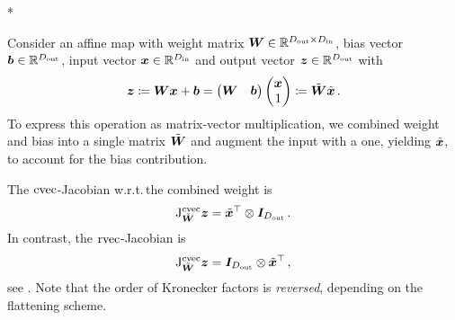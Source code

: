 \switchcolumn[1]*
\switchcolumn[0]

\begin{example}
  Consider an affine map with weight matrix ${\bm{W}} \in {\mathbb{R}}^{D_{\text{out}} \times D_{\text{in}}}$, bias vector ${\bm{b}} \in {\mathbb{R}}^{D_{\text{out}}}$, input vector ${\bm{x}} \in {\mathbb{R}}^{D_{\text{in}}}$ and output vector ${\bm{z}} \in {\mathbb{R}}^{D_{\text{out}}}$ with
  \begin{align*}
    {\bm{z}}
    \coloneqq
    {\bm{W}} {\bm{x}} + {\bm{b}}
    =
    \begin{pmatrix}
      {\bm{W}} & {\bm{b}}
    \end{pmatrix}
    \begin{pmatrix}
      {\bm{x}} \\ 1
    \end{pmatrix}
    \coloneqq
    \tilde{{\bm{W}}}
    \tilde{{\bm{x}}}\,.
  \end{align*}
  To express this operation as matrix-vector multiplication, we combined weight and bias into a single matrix $\tilde{{\bm{W}}}$ and augment the input with a one, yielding $\tilde{{\bm{x}}}$, to account for the bias contribution.

  The $\operatorname{cvec}$-Jacobian w.r.t.\,the combined weight is
  \begin{align*}
    \mathrm{J}^{\operatorname{cvec}}_{\tilde{{\bm{W}}}}{\bm{z}}
    =
    \tilde{{\bm{x}}}^{\top}
    \otimes
    {\bm{I}}_{D_{\text{out}}}\,.
  \end{align*}
  In contrast, the $\operatorname{rvec}$-Jacobian is
  \begin{align*}
    \mathrm{J}^{\operatorname{cvec}}_{\tilde{{\bm{W}}}}{\bm{z}}
    =
    {\bm{I}}_{D_{\text{out}}}
    \otimes
    \tilde{{\bm{x}}}^{\top}\,,
  \end{align*}
  see .
  Note that the order of Kronecker factors is \emph{reversed}, depending on the flattening scheme.
\end{example}

